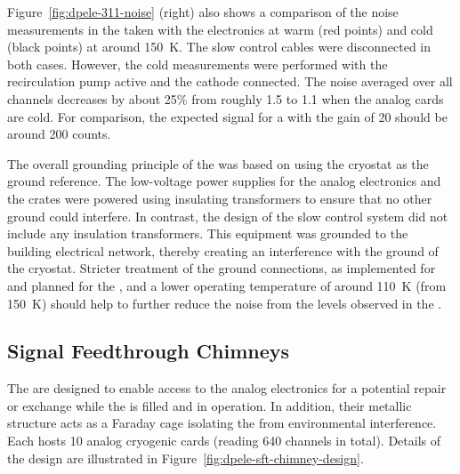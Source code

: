 Figure~\ref{fig:dpele-311-noise} (right) also shows a comparison of the noise measurements in the  taken with the  electronics at warm (red points) and cold (black points) at around \SI{150}{\kelvin}. The slow control cables were disconnected in both cases. However, the cold measurements were performed with the recirculation pump active and the cathode  connected. 
The \rms noise averaged over all channels decreases by about 25\% from roughly \SI{1.5}{} to \SI{1.1}{} when the  analog cards are cold. For comparison, the expected signal for a  with the  gain of \num{20} should be around \SI{200}{} counts. %

The overall grounding principle of the  was based on %
using the cryostat as the ground reference. The low-voltage power supplies for the  analog electronics and the  crates were powered %
using insulating transformers to ensure that %
no other ground could interfere. %
In contrast, the design of the slow control system did not include any insulation transformers. This equipment was grounded to the building electrical network, thereby creating an interference with the ground of the cryostat. Stricter treatment of the ground connections, as %
implemented for  and planned for the , and a lower  operating temperature of around \SI{110}{\kelvin} (from \SI{150}{\kelvin}) should help to further reduce the noise %
from the levels observed in the .


\subsection{Signal Feedthrough Chimneys}
\label{sec:fddp-tpc-elec-design-sft}

The  are designed to enable access to the  analog electronics for a potential repair or exchange while the  is filled and in operation. %
In addition, their metallic structure acts as a Faraday cage isolating the   from environmental interference.  Each  hosts \num{10} analog cryogenic  cards (reading \num{640} channels in total).  %
Details of the design are illustrated in Figure~\ref{fig:dpele-sft-chimney-design}. 

